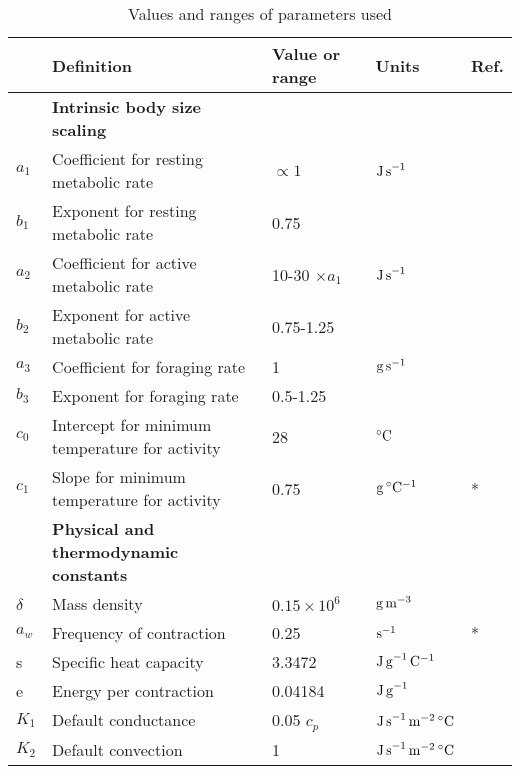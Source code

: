 
\begin{table}
\begin{threeparttable}[b]
\caption{Values and ranges of parameters used }
\begin{tabular}{l l l l l}
\toprule
 & Definition & Value or range & Units & Ref. \\
\midrule
&\textbf{Intrinsic body size scaling} & & &  \\
$a_1$ & Coefficient for resting metabolic rate  & $\propto 1$  & $\rm{J \, s}^{-1}$ & \tnote{1} \\ %
$b_1$ & Exponent for resting metabolic rate  & 0.75 &  & \tnote{2} \\
$a_2$ & Coefficient for active metabolic rate  & 10-30 $ \times a_1$ & $\rm{J \, s}^{-1}$ &  \tnote{3} \\
$b_2$ & Exponent for active metabolic rate  & 0.75-1.25 & &  \tnote{1} \\
$a_3$ & Coefficient for foraging rate  & 1 & $\rm{g \, s}^{-1}$  & \\
$b_3$ & Exponent  for foraging rate  & 0.5-1.25 &  &  \tnote{4}  \\
$c_0$ & Intercept for minimum temperature for activity & 28 & $^{\circ}\rm{C}$  & \tnote{5}\\
$c_1$ & Slope for minimum temperature for activity & 0.75 &  $\rm{g \,  ^{\circ}C^{-1}}$ &  \tnote{5} \hspace{0.1cm}* \\
& \textbf{Physical and thermodynamic constants} & & &  \\
$\delta $ & Mass density & $0.15 \times 10^6$  & $\rm{g \, m}^{-3}$  & \tnote{6}\\
$a_w$& Frequency of contraction & 0.25 & $\rm{s}^{-1}$   & \tnote{7} \hspace{0.1cm}*\\
s & Specific heat capacity & 3.3472 & $\rm{J \, g}^{-1}\,\rm{C}^{-1}$ & \tnote{1} \\
e & Energy per contraction & 0.04184 & $\rm{J \, g}^{-1}$ & \tnote{8} \\
$K_1$& Default conductance & 0.05 $c_p$ & $\rm{J \,s}^{-1} \, \rm{m}^{-2} \, ^{\circ}\rm{C}$  & \tnote{9} \\
$K_2$& Default convection & 1   & $\rm{J \,s}^{-1} \, \rm{m}^{-2} \, ^{\circ}\rm{C}$  & \tnote{9} \\

\end{tabular}
\end{threeparttable}
\end{table}
